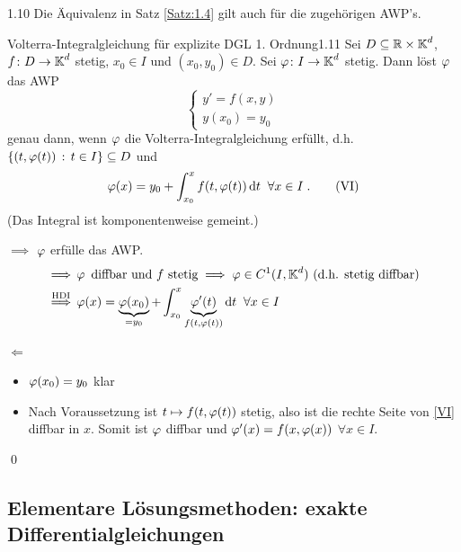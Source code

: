 \documentclass[a4paper]{article}
\begin{document}
\begin{Bemerkung}{}{1.10}
 Die Äquivalenz in Satz \ref{Satz:1.4} gilt auch für die zugehörigen AWP's.
 \end{Bemerkung}

\begin{Satz}{Volterra-Integralgleichung für explizite DGL 1. Ordnung}{1.11}
Sei $D \subseteq\mathbb R\times \operatorname{\mathbb K}^d$, $f\colon D\to \operatorname{\mathbb K}^d$ stetig, $x_0\in I$ und $(x_0,y_0)\in D$. Sei $\operatorname{\varphi}\colon I\to\operatorname{\mathbb K}^d$ stetig. Dann löst $\operatorname{\varphi}$ das AWP
\[\left\{\begin{array}{c}
     y'=f(x,y)  \\
     y(x_0)=y_0
\end{array}\right.\]
 genau dann, wenn $\operatorname{\varphi}$ die Volterra-Integralgleichung erfüllt, d.h. $\{(t,\operatorname{\varphi}(t))\,:\,t\in I\}\subseteq D$ und
 \[\operatorname{\varphi}(x)=y_0+\int_{x_0}^xf(t,\operatorname{\varphi}(t))\mathop{}\!\mathrm{d} t\;\;\forall x\in I\;.\tag{VI}\label{VI}\]
 (Das Integral ist komponentenweise gemeint.)
\end{Satz}
\begin{Beweis}
\glqq $\implies $\grqq{} $\operatorname{\varphi}$ erfülle das AWP.
\begin{align*}
\implies& \operatorname{\varphi} \text{ diffbar und $f$ stetig}\implies \operatorname{\varphi}\in C^1(I,\operatorname{\mathbb K}^d) \text{ (d.h. stetig diffbar)}\\
\overset{\text{HDI}}{\implies} & \operatorname{\varphi}(x)=\underbrace{\operatorname{\varphi}(x_0)}_{=y_0}+\int_{x_0}^x\underbrace{\operatorname{\varphi}'(t)}_{f(t,\operatorname{\varphi}(t))}\mathop{}\!\mathrm{d} t\;\;\forall x\in I
\end{align*}

\glqq $\Longleftarrow$\grqq{}
\begin{itemize}
\item $\operatorname{\varphi}(x_0)=y_0$ klar
\item Nach Voraussetzung ist $t\mapsto f(t,\operatorname{\varphi}(t))$ stetig, also ist die rechte Seite von \eqref{VI} diffbar in $x$. Somit ist $\operatorname{\varphi}$ diffbar und $\operatorname{\varphi}'(x)=f(x,\operatorname{\varphi}(x))$ $\forall x\in I$.
\end{itemize}
\qed
\end{Beweis}
\newpage
\subsection{Elementare Lösungsmethoden: exakte Differentialgleichungen}
\end{document}
